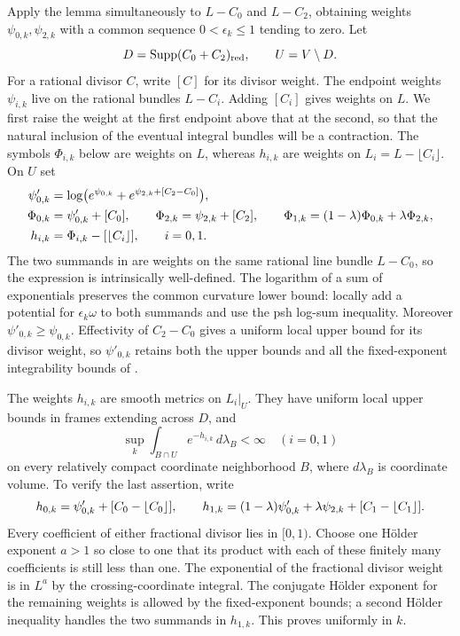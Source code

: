 Apply the lemma simultaneously to $L-C_0$ and $L-C_2$, obtaining
weights $\psi_{0,k},\psi_{2,k}$ with a common sequence
$0<\epsilon_k\le1$ tending to zero.  Let
\[
 D=\operatorname{Supp}(C_0+C_2)_{\rm red},\qquad U=V\setminus D.
\]
For a rational divisor $C$, write $[C]$ for its divisor weight.
The endpoint weights $\psi_{i,k}$ live on the rational bundles
$L-C_i$. Adding $[C_i]$ gives weights on $L$. We first raise the
weight at the first endpoint above that at the second, so that the
natural inclusion of the eventual integral bundles will be a
contraction. The symbols $\Phi_{i,k}$ below are weights on $L$,
whereas $h_{i,k}$ are weights on $L_i=L-\lfloor C_i\rfloor$.
On $U$ set
\begin{align}
 \psi'_{0,k}
   &=\log\bigl(e^{\psi_{0,k}}
             +e^{\psi_{2,k}+[C_2-C_0]}\bigr),
       \label{eq:logsum-endpoint}\\
 \Phi_{0,k}&=\psi'_{0,k}+[C_0],\qquad
 \Phi_{2,k}=\psi_{2,k}+[C_2],\qquad
 \Phi_{1,k}=(1-\lambda)\Phi_{0,k}+\lambda\Phi_{2,k},
       \label{eq:interior-weights}\\
 h_{i,k}&=\Phi_{i,k}-[\lfloor C_i\rfloor],\qquad i=0,1.
       \label{eq:integral-line-weights}
\end{align}
The two summands in  are weights on the same
rational line bundle $L-C_0$, so the expression is intrinsically
well-defined.  The logarithm of a sum of exponentials preserves the
common curvature lower bound: locally add a potential for
$\epsilon_k\omega$ to both summands and use the psh log-sum
inequality.  Moreover $\psi'_{0,k}\ge\psi_{0,k}$.  Effectivity of
$C_2-C_0$ gives a uniform local upper bound for its divisor weight, so
$\psi'_{0,k}$ retains both the upper bounds and all the fixed-exponent
integrability bounds of .

The weights $h_{i,k}$ are smooth metrics on $L_i|_U$.  They have
uniform local upper bounds in frames extending across $D$, and
\begin{equation}\label{eq:weight-integral-bounds}
 \sup_k\int_{B\cap U}e^{-h_{i,k}}\,d\lambda_B<\infty
 \quad(i=0,1)
\end{equation}
on every relatively compact coordinate neighborhood $B$, where
$d\lambda_B$ is coordinate volume.  To verify the last assertion,
write
\[
 h_{0,k}=\psi'_{0,k}+[C_0-\lfloor C_0\rfloor],\qquad
 h_{1,k}=(1-\lambda)\psi'_{0,k}+\lambda\psi_{2,k}
                      +[C_1-\lfloor C_1\rfloor].
\]
Every coefficient of either fractional divisor lies in $[0,1)$.
Choose one H\"older exponent $a>1$ so close to one that its product
with each of these finitely many coefficients is still less than one.
The exponential of the fractional divisor weight is in $L^a$ by the
crossing-coordinate integral.  The conjugate H\"older exponent for
the remaining weights is allowed by the fixed-exponent bounds; a
second H\"older inequality handles the two summands in $h_{1,k}$.
This proves  uniformly in $k$.

